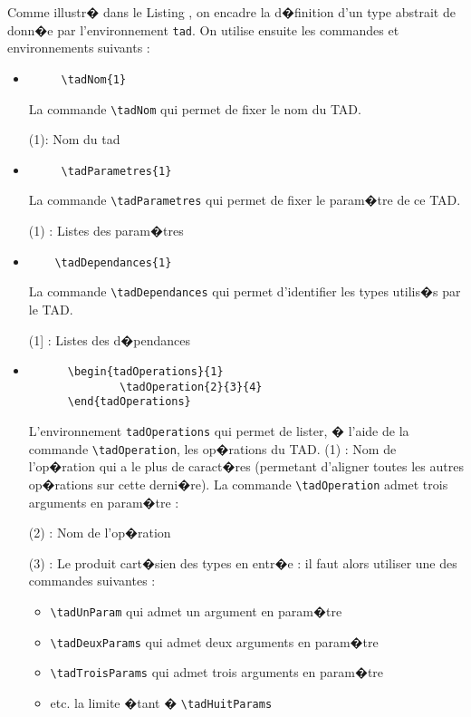 \documentclass[a4paper,12pt]{report}
\begin{document}
{Comme illustr� dans le Listing , on encadre la d�finition d'un type abstrait de donn�e par l'environnement \texttt{tad}.
 On utilise ensuite les commandes et environnements suivants :
\begin{itemize}
\item
  \begin{lstlisting}
     \tadNom{1}  
  \end{lstlisting}
  La commande \texttt{\textbackslash tadNom} qui permet de fixer le nom du TAD.


(1): Nom du tad 

\item
   \begin{lstlisting}
     \tadParametres{1}
  \end{lstlisting}
  La commande \texttt{\textbackslash tadParametres} qui permet de fixer le param�tre de ce TAD.


 (1) : Listes des param�tres
\item 
  \begin{lstlisting}
    \tadDependances{1}
  \end{lstlisting}
  La commande \texttt{\textbackslash tadDependances}  qui permet d'identifier  les types utilis�s par le TAD.  


 (1] : Listes des d�pendances

\item 
  \begin{lstlisting}
      \begin{tadOperations}{1}
              \tadOperation{2}{3}{4}
      \end{tadOperations}
  \end{lstlisting}
  L'environnement \texttt{tadOperations} qui permet de lister, � l'aide de la commande \texttt{\textbackslash tadOperation}, les op�rations du TAD. 
 (1) : Nom de l'op�ration qui a le plus de  caract�res (permetant d'aligner toutes les autres op�rations sur cette derni�re).
 La commande \texttt{\textbackslash tadOperation} admet trois arguments en param�tre :


 (2) : Nom de l'op�ration


 (3) : Le produit cart�sien des types en entr�e : il faut alors utiliser une des commandes suivantes :
      \begin{itemize}
        \item \texttt{\textbackslash tadUnParam} qui admet un argument en param�tre
       \item \texttt{\textbackslash tadDeuxParams} qui admet deux arguments en param�tre
        \item \texttt{\textbackslash tadTroisParams} qui admet trois arguments en param�tre
        \item etc. la limite �tant �  \texttt{\textbackslash tadHuitParams}
      \end{itemize}


\end{itemize}}
\end{document}
